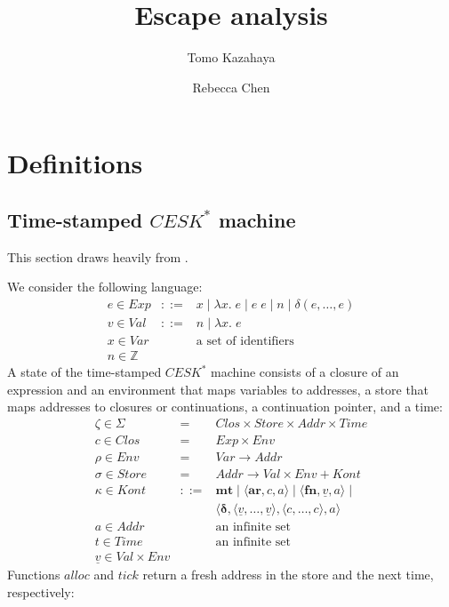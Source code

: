 \RequirePackage[hyphens]{url}\documentclass[12pt,oneside]{amsart}
\title{Escape analysis}
\author{Tomo Kazahaya \and Rebecca Chen}
\newcommand{\kw}[1]{\mathbf{#1}}
\newcommand{\lmd}[2]{\lambda #1.\;#2}
\begin{document}
\maketitle

\section{Definitions}

\subsection{Time-stamped $CESK^\ast$ machine}

This section draws heavily from \cite{CS152, HM}.

We consider the following language:
\[\begin{array}{lll}
    e \in Exp & ::= &
        x \mid \lmd{x}{e} \mid e\;e \mid n \mid \delta\left(e,\ldots,e\right) \\
    v \in Val & ::= & n \mid \lmd{x}{e} \\
    x \in Var & & \text{a set of identifiers} \\
    n \in \mathbb{Z}
\end{array}\]
A state of the time-stamped $CESK^\ast$ machine consists of a closure of an expression and an environment that maps variables to addresses, a store that maps addresses to closures or continuations, a continuation pointer, and a time:
\[\begin{array}{lll}
    \zeta \in \Sigma & = & Clos \times Store \times Addr \times Time \\
    c \in Clos & = & Exp \times Env \\
    \rho \in Env & = & Var \rightarrow Addr \\
    \sigma \in Store & = & Addr \rightarrow Val \times Env + Kont \\
    \kappa \in Kont & ::= & \kw{mt} \mid \langle\kw{ar}, c, a\rangle
        \mid \langle\kw{fn}, \underline{v}, a\rangle \mid \\ & & \langle\pmb{\delta}, \langle\underline{v}, \ldots, \underline{v}\rangle, \langle c, \ldots, c\rangle, a\rangle \\
    a \in Addr & & \text{an infinite set} \\
    t \in Time & & \text{an infinite set} \\
    \underline{v} \in Val \times Env
\end{array}\]
Functions $alloc$ and $tick$ return a fresh address in the store and the next time, respectively:
\end{document}
